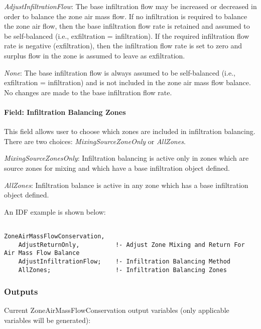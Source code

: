 \emph{AdjustInfiltrationFlow}: The base infiltration flow may be increased or decreased in order to balance the zone air mass flow. If no infiltration is required to balance the zone air flow, then the base infiltration flow rate is retained and assumed to be self-balanced (i.e., exfiltration = infiltration). If the required infiltration flow rate is negative (exfiltration), then the infiltration flow rate is set to zero and surplus flow in the zone is assumed to leave as exfiltration.

\emph{None}: The base infiltration flow is always assumed to be self-balanced (i.e., exfiltration = infiltration) and is not included in the zone air mass flow balance. No changes are made to the base infiltration flow rate.

\paragraph{Field: Infiltration Balancing Zones}\label{field-infiltration-balancing-zones}

This field allows user to choose which zones are included in infiltration balancing. There are two choices: \emph{MixingSourceZoneOnly} or \emph{AllZones}.

\emph{MixingSourceZonesOnly}: Infiltration balancing is active only in zones which are source zones for mixing and which have a base infiltration object defined.

\emph{AllZones}: Infiltration balance is active in any zone which has a base infiltration object defined.

An IDF example is shown below:

\begin{lstlisting}

ZoneAirMassFlowConservation,
    AdjustReturnOnly,          !- Adjust Zone Mixing and Return For Air Mass Flow Balance
    AdjustInfiltrationFlow;    !- Infiltration Balancing Method
    AllZones;                  !- Infiltration Balancing Zones
\end{lstlisting}

\subsubsection{Outputs}\label{outputs-7-000}

Current ZoneAirMassFlowConservation output variables (only applicable variables will be generated):

